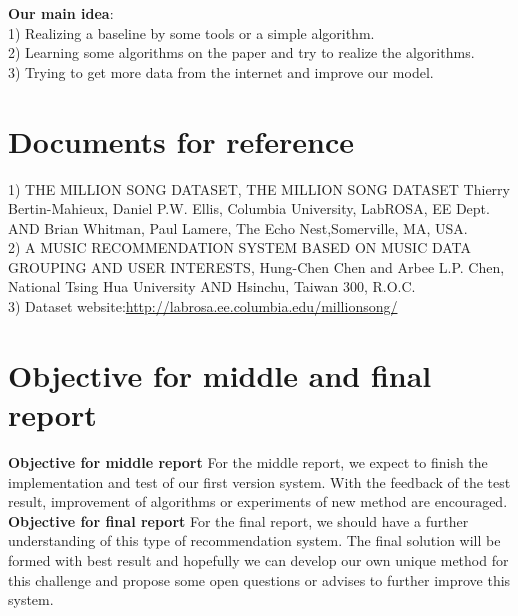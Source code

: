 \documentclass[a4paper]{article}
\begin{document}
\textbf{Our main idea}:\\
1) Realizing a baseline by some tools or a simple algorithm.  \\
2) Learning some algorithms on the paper and try to realize the algorithms.\\ 
3) Trying to get more data from the internet and improve our model.

\section{Documents for reference}
1) THE MILLION SONG DATASET, THE MILLION SONG DATASET Thierry Bertin-Mahieux, Daniel P.W. Ellis, Columbia University, LabROSA, EE Dept. AND Brian Whitman, Paul Lamere, The Echo Nest,Somerville, MA, USA.\\
2) A MUSIC RECOMMENDATION SYSTEM BASED ON MUSIC DATA GROUPING AND USER INTERESTS, Hung-Chen Chen and Arbee L.P. Chen, National Tsing Hua University AND Hsinchu, Taiwan 300, R.O.C.\\
3) Dataset website:\url{http://labrosa.ee.columbia.edu/millionsong/}
\section{Objective for middle and final report}
\textbf{Objective for middle report}
For the middle report, we expect to finish the implementation and test of our first version system. With the feedback of the test result, improvement of algorithms or experiments of new method are encouraged.\\ 
\textbf{Objective for final report}
For the final report, we should have a further understanding of this type of recommendation system. The final solution will be formed with best result and hopefully we can develop our own unique method for this challenge and propose some open questions or advises to further improve this system.
\end{document}
